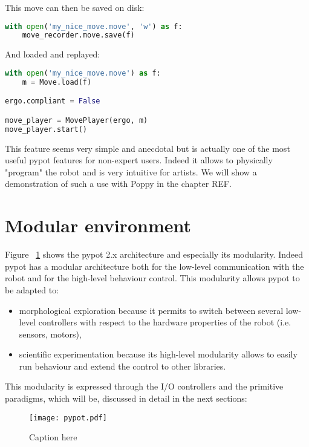 This move can then be saved on disk:
\begin{lstlisting}[language = Python]
with open('my_nice_move.move', 'w') as f:
    move_recorder.move.save(f)
\end{lstlisting}

And loaded and replayed:
\begin{lstlisting}[language = Python]
with open('my_nice_move.move') as f:
    m = Move.load(f)

ergo.compliant = False

move_player = MovePlayer(ergo, m)
move_player.start()
\end{lstlisting}

This feature seems very simple and anecdotal but is actually one of the most useful pypot features for non-expert users. Indeed it allows to physically "program" the robot and is very intuitive for artists. We will show a demonstration of such a use with Poppy in the chapter REF.



\section{Modular environment} %

Figure \figurename~\ref{fig:pypot-modular-architecture} shows the pypot 2.x architecture and especially its modularity. Indeed pypot has a modular architecture both for the low-level communication with the robot and for the high-level behaviour control. This modularity allows pypot to be adapted to:

\begin{itemize}
    \item morphological exploration because it permits to switch between several low-level controllers with respect to the hardware properties of the robot (i.e. sensors, motors),
    \item scientific experimentation because its high-level modularity allows to easily run behaviour and extend the control to other libraries.
\end{itemize}

This modularity is expressed through the I/O controllers and the primitive paradigms, which will be, discussed in detail in the next sections:


\begin{figure}[p]
    \begin{center}
        \texttt{[image: pypot.pdf]}
    \end{center}
    \caption{Caption here}
    \label{fig:pypot-modular-architecture}
\end{figure}


